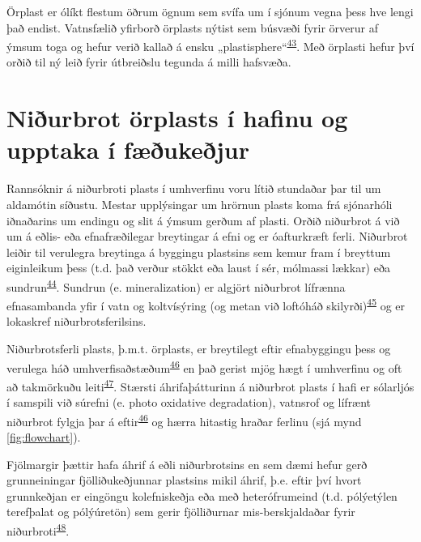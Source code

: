 \documentclass[icelandic,]{book}
\begin{document}
Örplast er ólíkt flestum öðrum ögnum sem svífa um í sjónum vegna þess hve lengi það endist. Vatnsfælið yfirborð örplasts nýtist sem búsvæði fyrir örverur af ýmsum toga og hefur verið kallað á ensku „plastisphere``\textsuperscript{\protect\hyperlink{ref-Zettler2013}{43}}. Með örplasti hefur því orðið til ný leið fyrir útbreiðslu tegunda á milli hafsvæða.

\hypertarget{niurbrot-orplasts-i-hafinu-og-upptaka-i-fukejur}{%
\section*{Niðurbrot örplasts í hafinu og upptaka í fæðukeðjur}\label{niurbrot-orplasts-i-hafinu-og-upptaka-i-fukejur}}

Rannsóknir á niðurbroti plasts í umhverfinu voru lítið stundaðar þar til um aldamótin síðustu. Mestar upplýsingar um hrörnun plasts koma frá sjónarhóli iðnaðarins um endingu og slit á ýmsum gerðum af plasti.
Orðið niðurbrot á við um á eðlis- eða efnafræðilegar breytingar á efni og er óafturkræft ferli. Niðurbrot leiðir til verulegra breytinga á byggingu plastsins sem kemur fram í breyttum eiginleikum þess (t.d. það verður stökkt eða laust í sér, mólmassi lækkar) eða sundrun\textsuperscript{\protect\hyperlink{ref-ISO472}{44}}. Sundrun (e. mineralization) er algjört niðurbrot lífrænna efnasambanda yfir í vatn og koltvísýring (og metan við loftóháð skilyrði)\textsuperscript{\protect\hyperlink{ref-SameiginlegaEes-nefndin2007}{45}} og er lokaskref niðurbrotsferilsins.

Niðurbrotsferli plasts, þ.m.t. örplasts, er breytilegt eftir efnabyggingu þess og verulega háð umhverfisaðstæðum\textsuperscript{\protect\hyperlink{ref-gewert2015pathways}{46}} en það gerist mjög hægt í umhverfinu og oft að takmörkuðu leiti\textsuperscript{\protect\hyperlink{ref-barnes2009accumulation}{47}}. Stærsti áhrifaþátturinn á niðurbrot plasts í hafi er sólarljós í samspili við súrefni (e. photo oxidative degradation), vatnsrof og lífrænt niðurbrot fylgja þar á eftir\textsuperscript{\protect\hyperlink{ref-gewert2015pathways}{46}} og hærra hitastig hraðar ferlinu (sjá mynd \ref{fig:flowchart}).

Fjölmargir þættir hafa áhrif á eðli niðurbrotsins en sem dæmi hefur gerð grunneiningar fjölliðukeðjunnar plastsins mikil áhrif, þ.e. eftir því hvort grunnkeðjan er eingöngu kolefniskeðja eða með heterófrumeind (t.d. pólýetýlen terefþalat og pólýúretön) sem gerir fjölliðurnar mis-berskjaldaðar fyrir niðurbroti\textsuperscript{\protect\hyperlink{ref-Singh2008}{48}}.
\end{document}
